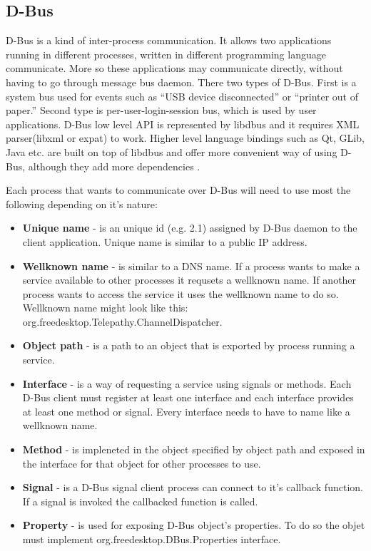 \subsection*{D-Bus}
D-Bus is a kind of inter-process communication. It allows two applications running in different processes, written in different programming language communicate. More so these applications may communicate directly, without having to go through message bus daemon. There two types of D-Bus. First is a system bus used for events such as ``USB device disconnected'' or ``printer out of paper.'' Second type is per-user-login-session bus, which is used by user applications. D-Bus low level API is represented by libdbus and it requires XML parser(libxml or expat) to work. Higher level language bindings such as Qt, GLib, Java etc. are built on top of libdbus and offer more convenient way of using D-Bus, although they add more dependencies \cite{dbus,TPWiki}.

Each process that wants to communicate over D-Bus will need to use most the following depending on it's nature: 
\begin{itemize}
	\item {\bf Unique name} - is an unique id (e.g. 2.1) assigned by D-Bus daemon to the client application. Unique name is similar to a public IP address.
	\item {\bf Wellknown name} - is similar to a DNS name. If a process wants to make a service available to other processes it requsets a wellknown name. If another process wants to access the service it uses the wellknown name to do so. Wellknown name might look like this: org.freedesktop.Telepathy.ChannelDispatcher.    
	\item {\bf Object path} - is a path to an object that is exported by process running a service.
	\item {\bf Interface} - is a way of requesting a service using signals or methods. Each D-Bus client must register at least one interface and each interface provides at least one method or signal. Every interface needs to have to name like a wellknown name.  
	\item {\bf Method} - is impleneted in the object specified by object path and exposed in the interface for that object for other processes to use. 
	\item {\bf Signal} - is a D-Bus signal client process can connect to it's callback function. If a signal is invoked the callbacked function is called.
	\item {\bf Property} - is used for exposing D-Bus object's properties. To do so the objet must implement org.freedesktop.DBus.Properties interface.
\end{itemize}

